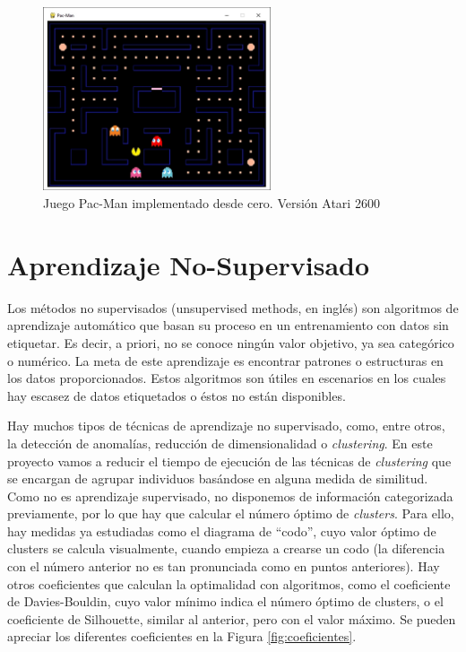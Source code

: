 		\begin{figure}[!h]			
			\centering
			\includegraphics[width=0.60\textwidth]{images/chapter_2/pacman}	
			\caption{Juego Pac-Man implementado desde cero. Versión Atari 2600}
			\label{fig:pacman}
		\end{figure}
		
	

\section{Aprendizaje No-Supervisado}

	Los métodos no supervisados (unsupervised methods, en inglés) son algoritmos de aprendizaje automático que basan su proceso en un entrenamiento con datos sin etiquetar. Es decir, a priori, no se conoce ningún valor objetivo, ya sea categórico o numérico. La meta de este aprendizaje es encontrar patrones o estructuras en los datos proporcionados. Estos algoritmos son útiles en escenarios en los cuales hay escasez de datos etiquetados o éstos no están disponibles.
	
	Hay muchos tipos de técnicas de aprendizaje no supervisado, como, entre otros, la detección de anomalías, reducción de dimensionalidad o \textit{clustering}. En este proyecto vamos a reducir el tiempo de ejecución de las técnicas de \textit{clustering} que se encargan de agrupar individuos basándose en alguna medida de similitud. Como no es aprendizaje supervisado, no disponemos de información categorizada previamente, por lo que hay que calcular el número óptimo de \textit{clusters}. Para ello, hay medidas ya estudiadas como el diagrama de ``codo'', cuyo valor óptimo de clusters se calcula visualmente, cuando empieza a crearse un codo (la diferencia con el número anterior no es tan pronunciada como en puntos anteriores). Hay otros coeficientes que calculan la optimalidad con algoritmos, como el coeficiente de Davies-Bouldin, cuyo valor mínimo indica el número óptimo de clusters, o el coeficiente de Silhouette, similar al anterior, pero con el valor máximo. Se pueden apreciar los diferentes coeficientes en la Figura \ref{fig:coeficientes}. 


